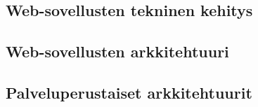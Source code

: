 
\subsection{Web-sovellusten tekninen kehitys}

\subsection{Web-sovellusten arkkitehtuuri}

\subsection{Palveluperustaiset arkkitehtuurit}

